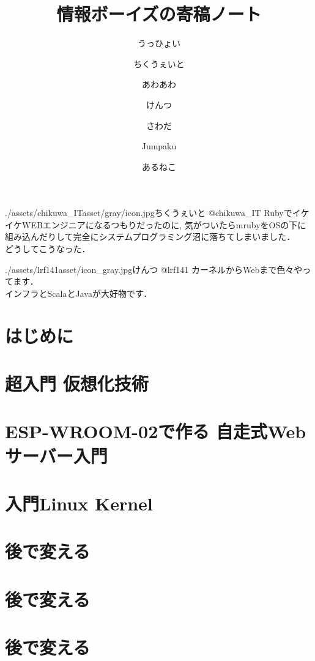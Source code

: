 \documentclass[autodetect-engine,dvipdfmx-if-dvi,ja=standard,b5paper,10.5pt,twoside,openany,layout=v2]{bxjsbook}
\title{情報ボーイズの寄稿ノート}
\author{うっひょい \and ちくうぇいと \and あわあわ \and けんつ \and さわだ \and Jumpaku \and あるねこ}
\date{}
\newcommand{\articlepath}{./articles}
\newcommand{\assetspath}{./assets}
\newcommand{\lrfasset}{\assetspath/lrf141asset}
\newcommand{\chikuwaitasset}{\assetspath/chikuwa_ITasset/gray}
\begin{document}
\frontmatter
\maketitle
\begin{myintroduce}{\chikuwaitasset/icon.jpg}{ちくうぇいと @chikuwa\_IT}
  RubyでイケイケWEBエンジニアになるつもりだったのに, 気がついたらmrubyをOSの下に組み込んだりして完全にシステムプログラミング沼に落ちてしまいました．\\
  どうしてこうなった．
\end{myintroduce}
\begin{myintroduce}{\lrfasset/icon_gray.jpg}{けんつ @lrf141}
  カーネルからWebまで色々やってます．\\
  インフラとScalaとJavaが大好物です．
\end{myintroduce}


\chapter{はじめに}
\addtolength{\oddsidemargin}{10pt}
\addtolength{\evensidemargin}{-10pt}


\tableofcontents
\mainmatter

\chapter{超入門 仮想化技術}


\chapter{ESP-WROOM-02で作る 自走式Webサーバー入門}


\chapter{入門Linux Kernel}


\chapter{後で変える}


\chapter{後で変える}


\chapter{後で変える}



\newpage
\myimpression[%
name=LOCAL Students\\情報ボーイズの寄稿ノート, %
author=うっひょい， \and %
ちくうぇいと， \and %
あわあわ， \\ \and %
けんつ， \and %
さわだ， \and %
Jumpaku， \and %
あるねこ, %
date=2018年4月22日, %
publisher=LOCAL学生部, %
print=有限会社ねこのしっぽ %
]%
\end{document}
